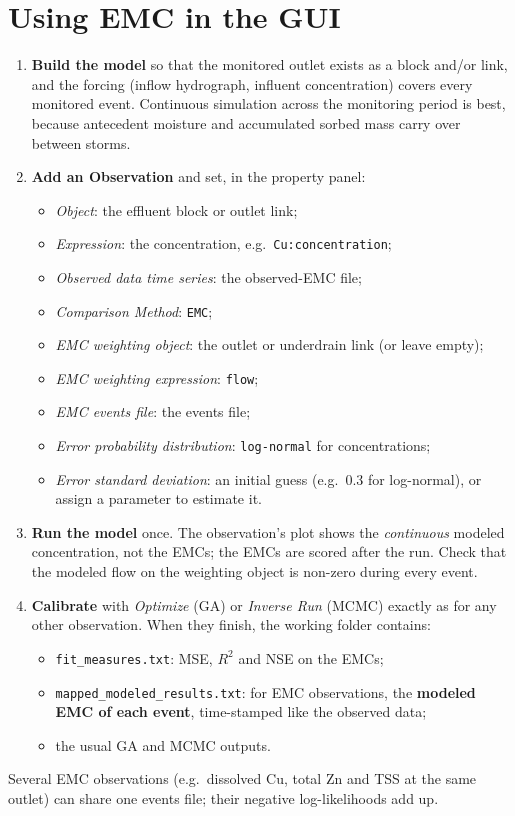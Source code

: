 \documentclass[11pt,a4paper]{article}
\newcommand{\code}[1]{\texttt{\small #1}}
\newcommand{\file}[1]{\texttt{\small #1}}
\begin{document}
\section{Using EMC in the GUI}
\begin{enumerate}[leftmargin=1.6em]
  \item \textbf{Build the model} so that the monitored outlet exists as a block
        and/or link, and the forcing (inflow hydrograph, influent concentration)
        covers every monitored event. Continuous simulation across the monitoring
        period is best, because antecedent moisture and accumulated sorbed mass
        carry over between storms.
  \item \textbf{Add an Observation} and set, in the property panel:
    \begin{itemize}
      \item \emph{Object}: the effluent block or outlet link;
      \item \emph{Expression}: the concentration, e.g.\ \code{Cu:concentration};
      \item \emph{Observed data time series}: the observed-EMC file;
      \item \emph{Comparison Method}: \code{EMC};
      \item \emph{EMC weighting object}: the outlet or underdrain link (or leave empty);
      \item \emph{EMC weighting expression}: \code{flow};
      \item \emph{EMC events file}: the events file;
      \item \emph{Error probability distribution}: \code{log-normal} for concentrations;
      \item \emph{Error standard deviation}: an initial guess (e.g.\ 0.3 for
            log-normal), or assign a parameter to estimate it.
    \end{itemize}
  \item \textbf{Run the model} once. The observation's plot shows the
        \emph{continuous} modeled concentration, not the EMCs; the EMCs are scored
        after the run. Check that the modeled flow on the weighting object is
        non-zero during every event.
  \item \textbf{Calibrate} with \emph{Optimize} (GA) or \emph{Inverse Run} (MCMC)
        exactly as for any other observation. When they finish, the working
        folder contains:
    \begin{itemize}
      \item \file{fit\_measures.txt}: MSE, $R^2$ and NSE on the EMCs;
      \item \file{mapped\_modeled\_results.txt}: for EMC observations, the
            \textbf{modeled EMC of each event}, time-stamped like the observed
            data;
      \item the usual GA and MCMC outputs.
    \end{itemize}
\end{enumerate}
Several EMC observations (e.g.\ dissolved Cu, total Zn and TSS at the same outlet)
can share one events file; their negative log-likelihoods add up.
\end{document}
